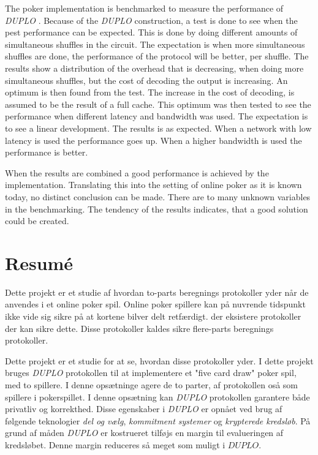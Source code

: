 \documentclass[twoside,11pt,openright]{report}
\newcommand{\DUPLO}{\textit{DUPLO} }
\begin{document}
The poker implementation is benchmarked to measure the performance of \DUPLO. Because of the \DUPLO construction, a test is done to see when the pest performance can be expected. This is done by doing different amounts of simultaneous shuffles in the circuit. The expectation is when more simultaneous shuffles are done, the performance of the protocol will be better, per shuffle. The results show a distribution of the overhead that is decreasing, when doing more simultaneous shuffles, but the cost of decoding the output is increasing. An optimum is then found from the test. The increase in the cost of decoding, is assumed to be the result of a full cache. This optimum was then tested to see the performance when different latency and bandwidth was used. The expectation is to see a linear development. The results is as expected. When a network with low latency is used the performance goes up. When a higher bandwidth is used the performance is better.

When the results are combined a good performance is achieved by the implementation. Translating this into the setting of online poker as it is known today, no distinct conclusion can be made. There are to many unknown variables in the benchmarking. The tendency of the results indicates, that a good solution could be created.


\chapter*{Resum\'e}

Dette projekt er et studie af hvordan to-parts beregnings protokoller yder når de anvendes i et online poker spil. Online poker spillere kan på nuvrende tidspunkt ikke vide sig sikre på at kortene bilver delt retfærdigt. der eksistere protokoller der kan sikre dette. Disse protokoller kaldes sikre flere-parts beregnings protokoller.

Dette projekt er et studie for at se, hvordan disse protokoller yder. I dette projekt bruges \DUPLO protokollen til at implementere et "five card draw" poker spil, med to spillere. I denne opsætninge agere de to parter, af protokollen oså som spillere i pokerspillet. I denne opsætning kan \DUPLO protokollen garantere både privatliv og korrekthed. Disse egenskaber i \DUPLO er opnået ved brug af følgende teknologier \textit{del og vælg}, \textit{kommitment systemer} og \textit{krypterede kredsløb}. På grund af måden \DUPLO er kostrueret tilføjs en margin til evalueringen af kredsløbet. Denne margin reduceres så meget som muligt i $DUPLO$. 
\end{document}
